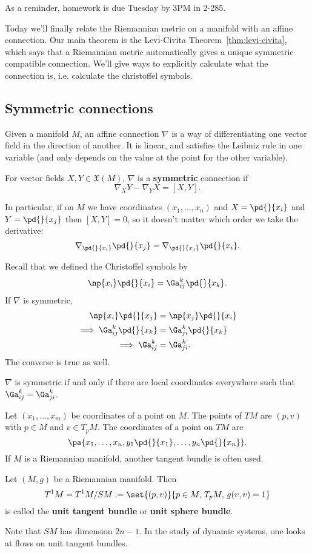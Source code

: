 
As a reminder, homework is due Tuesday by 3PM in 2-285.

Today we'll finally relate the Riemannian metric on a manifold with an affine connection. Our main theorem is the Levi-Civita Theorem~\ref{thm:levi-civita}, which says that a Riemannian metric automatically gives a unique symmetric compatible connection. We'll give ways to explicitly calculate what the connection is, i.e. calculate the christoffel symbols.

\subsection{Symmetric connections}

Given a manifold $M$, an affine connection $\nabla$ is a way of differentiating one vector field in the direction of another. It is linear, and satisfies the Leibniz rule in one variable (and only depends on the value at the point for the other variable).

\begin{df}
For vector fields $X,Y\in \mathfrak X(M)$, $\nabla$ is a \textbf{symmetric} connection if
\[
\nabla_XY-\nabla_YX=[X,Y].
\] 
\end{df}

In particular, if on $M$ we have coordinates $(x_1,\ldots, x_n)$ and $X=\pd{}{x_i}$ and $Y=\pd{}{x_j}$ then
$[X,Y]=0$, so it doesn't matter which order we take the derivative:
\[
\nabla_{\pd{}{x_i}}\pd{}{x_j}=\nabla_{\pd{}{x_j}}\pd{}{x_i}.
\]

Recall that we defined the Christoffel symbols by
\[
\np{x_i}\pd{}{x_i}=\Ga_{ij}^k \pd{}{x_k}.
\]
If $\nabla$ is symmetric,
\begin{align*}
\np{x_i}\pd{}{x_j}&=\np{x_j}\pd{}{x_i}\\
\implies\Ga_{ij}^k\pd{}{x_k}&=\Ga_{ji}^k\pd{}{x_k}\\
\implies \Ga_{ij}^k&=\Ga_{ji}^k.
\end{align*}
The converse is true as well.
\begin{pr}
$\nabla$ is symmetric if and only if there are local coordinates everywhere such that $\Ga_{ij}^k=\Ga_{ji}^k$.
\end{pr}
Let $(x_1,\ldots, x_m)$ be coordinates of a point on $M$. The points of $TM$ are $(p,v)$ with $p\in M$ and $v\in T_pM$. The coordinates of a point on $TM$ are
\[
\pa{
x_1,\ldots, x_n,y_1\pd{}{x_1},\ldots, y_n\pd{}{x_n}
}.
\]
If $M$ is a Riemannian manifold, another tangent bundle is often used.
\begin{df}
Let $(M,g)$ be a Riemannian manifold. Then
\[
T^1M=T^1M/SM:=\set{(p,v)}{p\in M,\,T_pM,\,g(v,v)=1}
\]
is called the \textbf{unit tangent bundle} or \textbf{unit sphere bundle}.
\end{df}
Note that $SM$ has dimension $2n-1$. In the study of dynamic systems, one looks at flows on unit tangent bundles.

